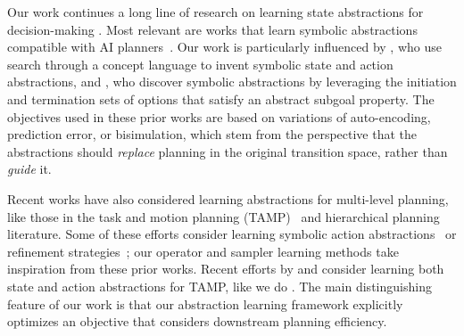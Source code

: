 
Our work continues a long line of research on learning state abstractions for decision-making \cite{bertsekas1988adaptive,andre2002state,jong2005state,li2006towards,abel2017near,zhang2020learning}.
Most relevant are works that learn symbolic abstractions compatible with AI planners~\cite{lang2012exploration,jetchev2013learning,ugur2015bottom,asai2018classical,bonet2019learning,asai2020learning,ahmetoglu2020deepsym,umili2021learning}.
Our work is particularly influenced by \citet{pasula2007learning}, who use search through a concept language to invent symbolic state and action abstractions, and \citet{konidaris2018skills}, who discover symbolic abstractions by leveraging the initiation and termination sets of options that satisfy an abstract subgoal property.
The objectives used in these prior works are based on variations of auto-encoding, prediction error, or bisimulation, which stem from the perspective that the abstractions should \emph{replace} planning in the original transition space, rather than \emph{guide} it.

Recent works have also considered learning abstractions for multi-level planning, like those in the task and motion planning (TAMP)~\cite{gravot2005asymov,garrett2021integrated} and hierarchical planning~\cite{bercher2019survey} literature.
Some of these efforts consider learning symbolic action abstractions~\cite{zhuo2009learning,nguyen2017automated,silver2021learning,aineto2022comprehensive} or refinement strategies~\cite{chitnis2016guided,mandalika2019generalized,chitnis2019learning,wang2021learning,chitnis2021learning,ortiz2022structured}; our operator and sampler learning methods take inspiration from these prior works.
Recent efforts by \citet{loula2019discovering} and \citet{curtis2021discovering} consider learning both state and action abstractions for TAMP, like we do \cite{loula2019discovering,loula2020learning,curtis2021discovering}.
The main distinguishing feature of our work is that our abstraction learning framework explicitly optimizes an objective that considers downstream planning efficiency.

